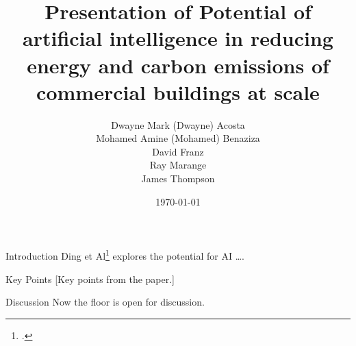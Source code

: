 \documentclass{beamer}
\title{Presentation of Potential of artificial intelligence in reducing energy and carbon emissions of commercial buildings at scale}
\author{Dwayne Mark (Dwayne) Acosta \\ Mohamed Amine (Mohamed) Benaziza \\ David Franz \\ Ray Marange \\ James Thompson}
\date{\today}
\begin{document}
\frame{\titlepage}

\begin{frame}{Introduction}
Ding et Al\footcite{dingPotentialArtificialIntelligence2024} explores the potential for AI \dots.

\end{frame}

\begin{frame}{Key Points}
[Key points from the paper.]
\end{frame}

\begin{frame}{Discussion}
Now the floor is open for discussion.
\end{frame}
\end{document}
